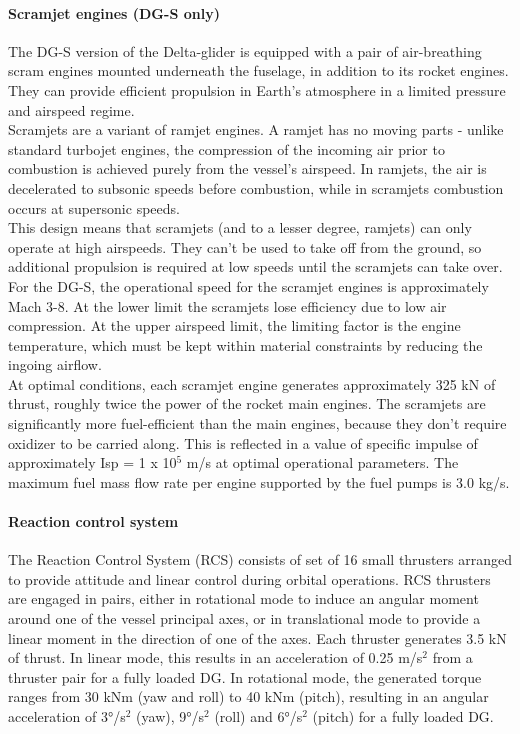\documentclass[Orbiter User Manual.tex]{subfiles}
\begin{document}
\paragraph{Scramjet engines (DG-S only)}
The DG-S version of the Delta-glider is equipped with a pair of air-breathing scram engines mounted underneath the fuselage, in addition to its rocket engines. They can provide efficient propulsion in Earth's atmosphere in a limited pressure and airspeed regime.\\
Scramjets are a variant of ramjet engines. A ramjet has no moving parts - unlike standard turbojet engines, the compression of the incoming air prior to combustion is achieved purely from the vessel's airspeed. In ramjets, the air is decelerated to subsonic speeds before combustion, while in scramjets combustion occurs at supersonic speeds.\\
This design means that scramjets (and to a lesser degree, ramjets) can only operate at high airspeeds. They can't be used to take off from the ground, so additional propulsion is required at low speeds until the scramjets can take over. For the DG-S, the operational speed for the scramjet engines is approximately Mach 3-8. At the lower limit the scramjets lose efficiency due to low air compression. At the upper airspeed limit, the limiting factor is the engine temperature, which must be kept within material constraints by reducing the ingoing airflow.\\
At optimal conditions, each scramjet engine generates approximately 325 kN of thrust, roughly twice the power of the rocket main engines. The scramjets are significantly more fuel-efficient than the main engines, because they don't require oxidizer to be carried along. This is reflected in a value of specific impulse of approximately Isp = 1 x 10$^{5}$ m/s at optimal operational parameters. The maximum fuel mass flow rate per engine supported by the fuel pumps is 3.0 kg/s.

\paragraph{Reaction control system}
The Reaction Control System (RCS) consists of set of 16 small thrusters arranged to provide attitude and linear control during orbital operations. RCS thrusters are engaged in pairs, either in rotational mode to induce an angular moment around one of the vessel principal axes, or in translational mode to provide a linear moment in the direction of one of the axes. Each thruster generates 3.5 kN of thrust. In linear mode, this results in an acceleration of 0.25 m/s$^{2}$ from a thruster pair for a fully loaded DG. In rotational mode, the generated torque ranges from 30 kNm (yaw and roll) to 40 kNm (pitch), resulting in an angular acceleration of 3°/s$^{2}$ (yaw), 9°/s$^{2}$ (roll) and 6°/s$^{2}$ (pitch) for a fully loaded DG.
\end{document}
